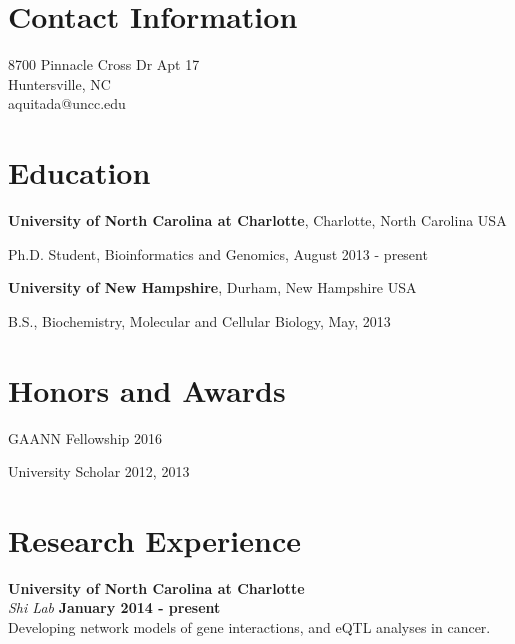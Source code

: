 \documentclass[margin,line]{res}
\newenvironment{list1}{
  \begin{list}{\ding{113}}{%
      \setlength{\itemsep}{0in}
      \setlength{\parsep}{0in} \setlength{\parskip}{0in}
      \setlength{\topsep}{0in} \setlength{\partopsep}{0in} 
      \setlength{\leftmargin}{0.17in}}}{\end{list}}
\begin{document}

\begin{resume}
\section{\sc Contact Information}
\vspace{.05in}
8700 Pinnacle Cross Dr Apt 17  \\                    
Huntersville, NC \\
aquitada@uncc.edu\\       


\section{\sc Education}
{\bf University of North Carolina at Charlotte}, Charlotte, North Carolina USA\\

\vspace*{-.1in}
\begin{list1}
\item[] Ph.D. Student, Bioinformatics and Genomics, August 2013 - present
\end{list1}


{\bf University of New Hampshire}, Durham, New Hampshire USA\\ 
\vspace*{-.1in}
\begin{list1}
\item[] B.S., Biochemistry, Molecular and Cellular Biology,  May, 2013
\end{list1}


\section{\sc Honors and Awards} 

GAANN Fellowship 2016

University Scholar 2012, 2013


\section{\sc Research Experience}
{\bf University of North Carolina at Charlotte}\\
{\em Shi Lab} \hfill {\bf January 2014 - present}\\
Developing network models of gene interactions, and eQTL analyses in cancer.


\end{resume}
\end{document}

